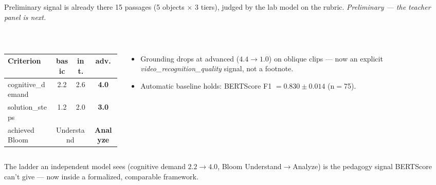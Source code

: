 \documentclass[aspectratio=169,10pt]{beamer}
\begin{document}
\begin{frame}{Preliminary signal is already there}
\scriptsize
15 passages (5 objects $\times$ 3 tiers), judged by the lab model on the rubric.
\emph{Preliminary --- the teacher panel is next.}
\vspace{0.2em}
\begin{columns}[T]
\begin{column}{0.48\textwidth}
\\[2pt]
\begin{tabular}{@{}lccc@{}}
\toprule
\textbf{Criterion} & \color{cBasic}basic & \color{cInter}int. & \color{cAdv}adv. \\
\midrule
cognitive\_demand & 2.2 & 2.6 & \textbf{4.0} \\
solution\_steps & 1.2 & 2.0 & \textbf{3.0} \\
achieved Bloom & \multicolumn{2}{c}{Understand} & \textbf{Analyze} \\
\bottomrule
\end{tabular}
\end{column}
\begin{column}{0.52\textwidth}
\\[2pt]
\scriptsize
\begin{itemize}\setlength\itemsep{2pt}
  \item Grounding drops at advanced ($4.4\to1.0$) on oblique clips --- now an explicit
  \emph{video\_recognition\_quality} signal, not a footnote.
  \item Automatic baseline holds: BERTScore F1 $=0.830\pm0.014$ (n$=$75).
\end{itemize}
\end{column}
\end{columns}
\vspace{0.4em}
\begin{tcolorbox}[colback=cApp!6,colframe=cApp,boxsep=2pt,left=5pt,right=5pt]
\scriptsize The ladder an independent model sees (cognitive demand $2.2\to4.0$, Bloom
Understand$\to$Analyze) is the pedagogy signal BERTScore can't give --- now inside a formalized,
comparable framework.
\end{tcolorbox}
\end{frame}
\end{document}
